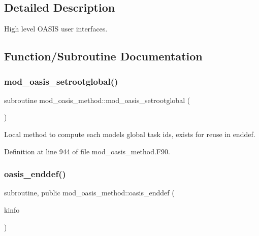 \subsection{Detailed Description}
High level O\+A\+S\+IS user interfaces. 

\subsection{Function/\+Subroutine Documentation}
\mbox{\label{namespacemod__oasis__method_a13d6e469ea14642a2e1e6cb807d9b7de}} 
\subsubsection{\texorpdfstring{mod\+\_\+oasis\+\_\+setrootglobal()}{mod\_oasis\_setrootglobal()}}
{\footnotesize\ttfamily subroutine mod\+\_\+oasis\+\_\+method\+::mod\+\_\+oasis\+\_\+setrootglobal (\begin{DoxyParamCaption}{ }\end{DoxyParamCaption})\hspace{0.3cm}{\ttfamily [private]}}



Local method to compute each models\textquotesingle{} global task ids, exists for reuse in enddef. 



Definition at line 944 of file mod\+\_\+oasis\+\_\+method.\+F90.

\mbox{\label{namespacemod__oasis__method_a093552f9f9895ac79a5fefa043fc5881}} 
\subsubsection{\texorpdfstring{oasis\+\_\+enddef()}{oasis\_enddef()}}
{\footnotesize\ttfamily subroutine, public mod\+\_\+oasis\+\_\+method\+::oasis\+\_\+enddef (\begin{DoxyParamCaption}\item[{integer (kind=ip\+\_\+intwp\+\_\+p), intent(inout), optional}]{kinfo }\end{DoxyParamCaption})}



